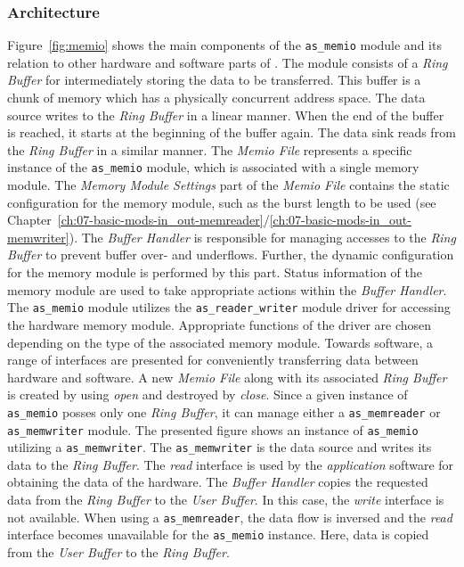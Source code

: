 \subsubsection*{Architecture}
Figure~\ref{fig:memio} shows the main components of the \texttt{as\_memio} module and its relation to other hardware and software parts of \asterics.
The module consists of a \textit{Ring Buffer} for intermediately storing the data to be transferred.
This buffer is a chunk of memory which has a physically concurrent address space.
The data source writes to the \textit{Ring Buffer} in a linear manner.
When the end of the buffer is reached, it starts at the beginning of the buffer again.
The data sink reads from the \textit{Ring Buffer} in a similar manner.
The \textit{Memio File} represents a specific instance of the \texttt{as\_memio} module, which is associated with a single memory module.
The \textit{Memory Module Settings} part of the \textit{Memio File} contains the static configuration for the memory module, such as the burst length to be used (see Chapter~\ref{ch:07-basic-mods-in_out-memreader}/\ref{ch:07-basic-mods-in_out-memwriter}).
The \textit{Buffer Handler} is responsible for managing accesses to the \textit{Ring Buffer} to prevent buffer over- and underflows.
Further, the dynamic configuration for the memory module is performed by this part.
Status information of the memory module are used to take appropriate actions within the \textit{Buffer Handler}.
The \texttt{as\_memio} module utilizes the \texttt{as\_reader\_writer} module driver for accessing the hardware memory module.
Appropriate functions of the driver are chosen depending on the type of the associated memory module.
Towards software, a range of interfaces are presented for conveniently transferring data between hardware and software.
A new \textit{Memio File} along with its associated \textit{Ring Buffer} is created by using \textit{open} and destroyed by \textit{close}.
Since a given instance of \texttt{as\_memio} posses only one \textit{Ring Buffer}, it can manage either a \texttt{as\_memreader} or \texttt{as\_memwriter} module.
The presented figure shows an instance of \texttt{as\_memio} utilizing a \texttt{as\_memwriter}.
The \texttt{as\_memwriter} is the data source and writes its data to the \textit{Ring Buffer}.
The \textit{read} interface is used by the \textit{application} software for obtaining the data of the hardware.
The \textit{Buffer Handler} copies the requested data from the \textit{Ring Buffer} to the \textit{User Buffer}.
In this case, the \textit{write} interface is not available.
When using a \texttt{as\_memreader}, the data flow is inversed and the \textit{read} interface becomes unavailable for the \texttt{as\_memio} instance.
Here, data is copied from the \textit{User Buffer} to the \textit{Ring Buffer}.

